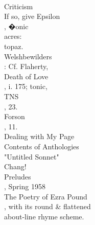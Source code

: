 \documentclass[smalldemyvopaper,11pt,twoside,onecolumn,openright,extrafontsizes]{memoir}
\begin{document}
\\Criticism
\\If so, give Epsilon
\\, �onic
\\acres:
\\topaz.
\\Welshbewilders
\\: Cf. Flaherty,
\\Death of Love
\\, i. 175; tonic,
\\TNS
\\, 23.
\\Forson
\\, 11.
\\Dealing with My Page
\\Contents of Anthologies
\\"Untitled Sonnet"
\\Chang!
\\Preludes
\\, Spring 1958
\\The Poetry of Ezra Pound
\\, with its round \& flattened
\\about-line rhyme scheme.
\end{document}
